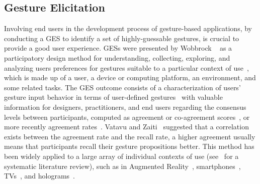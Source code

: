 \subsection{Gesture Elicitation} \label{sec:state_of_the_art:overview:ges}
Involving end users in the development process of gesture-based applications, \eg by conducting a GES to identify a set of highly-guessable gestures, is crucial to provide a good user experience.
GESs were presented by Wobbrock \etal~\cite{Wobbrock:2009} as a participatory design method for understanding, collecting, exploring, and analyzing users preferences for gestures suitable to a particular context of use~\cite{Calvary:2003}, which is made up of a user, a device or computing platform, an environment, and some related tasks. The GES outcome consists of a characterization of users' gesture input behavior in terms of user-defined gestures~\cite{Grijincu:2014} with valuable information for designers, practitioners, and end users regarding the consensus levels between participants, computed as agreement or co-agreement scores~\cite{Vatavu:2014b}, or more recently agreement rates~\cite{Vatavu:2015}.
Vatavu and Zaiti~\cite{Vatavu:2014b} suggested that a correlation exists between the agreement rate and the recall rate, \ie a higher agreement usually means that participants recall their gesture propositions better.
This method has been widely applied to a large array of individual contexts of use (see~\cite{Villarreal:2020} for a systematic literature review), such as in Augmented Reality~\cite{Piumsomboon:2013}, smartphones~\cite{Ruiz:2011}, TVs~\cite{Vatavu:2014b,Morris:2012,Dong:2015}, and holograms~\cite{Pham:2018}.

